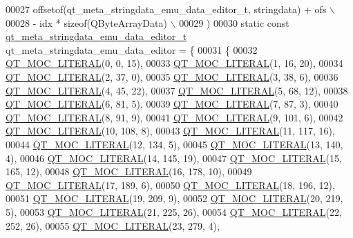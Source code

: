 \begin{DoxyCode}
00027 \textcolor{preprocessor}{    offsetof(qt\_meta\_stringdata\_emu\_data\_editor\_t, stringdata) + ofs \(\backslash\)}
00028 \textcolor{preprocessor}{        - idx * sizeof(QByteArrayData) \(\backslash\)}
00029 \textcolor{preprocessor}{    )}
00030 \textcolor{keyword}{static} \textcolor{keyword}{const} \hyperlink{a00065_da/d15/a00188}{qt\_meta\_stringdata\_emu\_data\_editor\_t} 
      qt\_meta\_stringdata\_emu\_data\_editor = \{
00031     \{
00032 \hyperlink{a00065_a75bb9482d242cde0a06c9dbdc6b83abe}{QT\_MOC\_LITERAL}(0, 0, 15),
00033 \hyperlink{a00065_a75bb9482d242cde0a06c9dbdc6b83abe}{QT\_MOC\_LITERAL}(1, 16, 20),
00034 \hyperlink{a00065_a75bb9482d242cde0a06c9dbdc6b83abe}{QT\_MOC\_LITERAL}(2, 37, 0),
00035 \hyperlink{a00065_a75bb9482d242cde0a06c9dbdc6b83abe}{QT\_MOC\_LITERAL}(3, 38, 6),
00036 \hyperlink{a00065_a75bb9482d242cde0a06c9dbdc6b83abe}{QT\_MOC\_LITERAL}(4, 45, 22),
00037 \hyperlink{a00065_a75bb9482d242cde0a06c9dbdc6b83abe}{QT\_MOC\_LITERAL}(5, 68, 12),
00038 \hyperlink{a00065_a75bb9482d242cde0a06c9dbdc6b83abe}{QT\_MOC\_LITERAL}(6, 81, 5),
00039 \hyperlink{a00065_a75bb9482d242cde0a06c9dbdc6b83abe}{QT\_MOC\_LITERAL}(7, 87, 3),
00040 \hyperlink{a00065_a75bb9482d242cde0a06c9dbdc6b83abe}{QT\_MOC\_LITERAL}(8, 91, 9),
00041 \hyperlink{a00065_a75bb9482d242cde0a06c9dbdc6b83abe}{QT\_MOC\_LITERAL}(9, 101, 6),
00042 \hyperlink{a00065_a75bb9482d242cde0a06c9dbdc6b83abe}{QT\_MOC\_LITERAL}(10, 108, 8),
00043 \hyperlink{a00065_a75bb9482d242cde0a06c9dbdc6b83abe}{QT\_MOC\_LITERAL}(11, 117, 16),
00044 \hyperlink{a00065_a75bb9482d242cde0a06c9dbdc6b83abe}{QT\_MOC\_LITERAL}(12, 134, 5),
00045 \hyperlink{a00065_a75bb9482d242cde0a06c9dbdc6b83abe}{QT\_MOC\_LITERAL}(13, 140, 4),
00046 \hyperlink{a00065_a75bb9482d242cde0a06c9dbdc6b83abe}{QT\_MOC\_LITERAL}(14, 145, 19),
00047 \hyperlink{a00065_a75bb9482d242cde0a06c9dbdc6b83abe}{QT\_MOC\_LITERAL}(15, 165, 12),
00048 \hyperlink{a00065_a75bb9482d242cde0a06c9dbdc6b83abe}{QT\_MOC\_LITERAL}(16, 178, 10),
00049 \hyperlink{a00065_a75bb9482d242cde0a06c9dbdc6b83abe}{QT\_MOC\_LITERAL}(17, 189, 6),
00050 \hyperlink{a00065_a75bb9482d242cde0a06c9dbdc6b83abe}{QT\_MOC\_LITERAL}(18, 196, 12),
00051 \hyperlink{a00065_a75bb9482d242cde0a06c9dbdc6b83abe}{QT\_MOC\_LITERAL}(19, 209, 9),
00052 \hyperlink{a00065_a75bb9482d242cde0a06c9dbdc6b83abe}{QT\_MOC\_LITERAL}(20, 219, 5),
00053 \hyperlink{a00065_a75bb9482d242cde0a06c9dbdc6b83abe}{QT\_MOC\_LITERAL}(21, 225, 26),
00054 \hyperlink{a00065_a75bb9482d242cde0a06c9dbdc6b83abe}{QT\_MOC\_LITERAL}(22, 252, 26),
00055 \hyperlink{a00065_a75bb9482d242cde0a06c9dbdc6b83abe}{QT\_MOC\_LITERAL}(23, 279, 4),

\end{DoxyCode}
